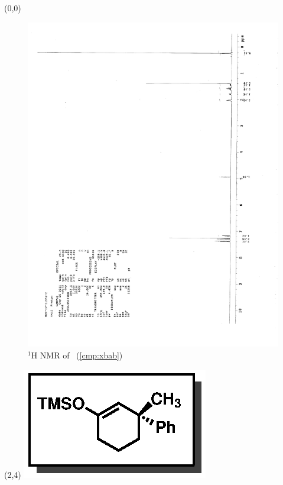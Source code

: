 \begin{textblock}{20}(0,0)
\begin{figure}[htb]
\caption{$^1$H NMR of \CMPxbab\ (\ref{cmp:xbab})}
\includegraphics[scale=0.75, trim = 0mm 0mm 0mm 5mm,
clip]{chp_singlecarbon/images/nmr/xbabH}
\vspace{-100pt}
\end{figure}
\end{textblock}
\begin{textblock}{1}(2,4)
\includegraphics[scale=0.8, angle=90]{chp_singlecarbon/images/xbab}
\end{textblock}
